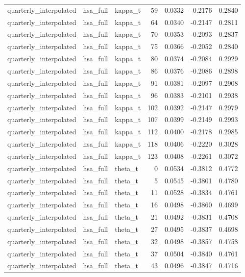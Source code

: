 \begin{tabular}{lllrrrr}
quarterly\_interpolated & hsa\_full & kappa\_t & 59 & 0.0332 & -0.2176 & 0.2840 \\
quarterly\_interpolated & hsa\_full & kappa\_t & 64 & 0.0340 & -0.2147 & 0.2811 \\
quarterly\_interpolated & hsa\_full & kappa\_t & 70 & 0.0353 & -0.2093 & 0.2837 \\
quarterly\_interpolated & hsa\_full & kappa\_t & 75 & 0.0366 & -0.2052 & 0.2840 \\
quarterly\_interpolated & hsa\_full & kappa\_t & 80 & 0.0374 & -0.2084 & 0.2929 \\
quarterly\_interpolated & hsa\_full & kappa\_t & 86 & 0.0376 & -0.2086 & 0.2898 \\
quarterly\_interpolated & hsa\_full & kappa\_t & 91 & 0.0381 & -0.2097 & 0.2908 \\
quarterly\_interpolated & hsa\_full & kappa\_t & 96 & 0.0383 & -0.2101 & 0.2938 \\
quarterly\_interpolated & hsa\_full & kappa\_t & 102 & 0.0392 & -0.2147 & 0.2979 \\
quarterly\_interpolated & hsa\_full & kappa\_t & 107 & 0.0399 & -0.2149 & 0.2993 \\
quarterly\_interpolated & hsa\_full & kappa\_t & 112 & 0.0400 & -0.2178 & 0.2985 \\
quarterly\_interpolated & hsa\_full & kappa\_t & 118 & 0.0406 & -0.2220 & 0.3028 \\
quarterly\_interpolated & hsa\_full & kappa\_t & 123 & 0.0408 & -0.2261 & 0.3072 \\
quarterly\_interpolated & hsa\_full & theta\_t & 0 & 0.0534 & -0.3812 & 0.4772 \\
quarterly\_interpolated & hsa\_full & theta\_t & 5 & 0.0545 & -0.3801 & 0.4780 \\
quarterly\_interpolated & hsa\_full & theta\_t & 11 & 0.0528 & -0.3834 & 0.4761 \\
quarterly\_interpolated & hsa\_full & theta\_t & 16 & 0.0498 & -0.3860 & 0.4699 \\
quarterly\_interpolated & hsa\_full & theta\_t & 21 & 0.0492 & -0.3831 & 0.4708 \\
quarterly\_interpolated & hsa\_full & theta\_t & 27 & 0.0495 & -0.3837 & 0.4698 \\
quarterly\_interpolated & hsa\_full & theta\_t & 32 & 0.0498 & -0.3857 & 0.4758 \\
quarterly\_interpolated & hsa\_full & theta\_t & 37 & 0.0504 & -0.3840 & 0.4761 \\
quarterly\_interpolated & hsa\_full & theta\_t & 43 & 0.0496 & -0.3847 & 0.4716 \\

\end{tabular}
